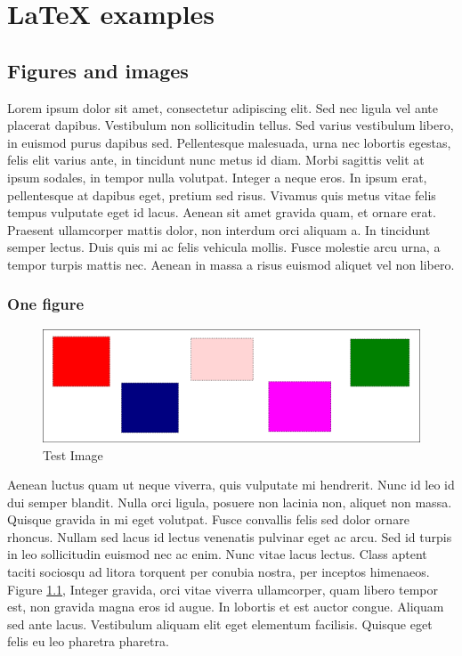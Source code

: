 \chapter{LaTeX examples}

\section{Figures and images}
Lorem ipsum dolor sit amet, consectetur adipiscing elit. Sed nec ligula vel
ante placerat dapibus. Vestibulum non sollicitudin tellus. Sed varius
vestibulum libero, in euismod purus dapibus sed. Pellentesque malesuada, urna
nec lobortis egestas, felis elit varius ante, in tincidunt nunc metus id diam.
Morbi sagittis velit at ipsum sodales, in tempor nulla volutpat. Integer a
neque eros. In ipsum erat, pellentesque at dapibus eget, pretium sed risus.
Vivamus quis metus vitae felis tempus vulputate eget id lacus. Aenean sit amet
gravida quam, et ornare erat. Praesent ullamcorper mattis dolor, non interdum
orci aliquam a. In tincidunt semper lectus. Duis quis mi ac felis vehicula
mollis. Fusce molestie arcu urna, a tempor turpis mattis nec. Aenean in massa a
risus euismod aliquet vel non libero.

\subsection{One figure}

\begin{figure}[h]
    \centering
    \includegraphics[width=\textwidth]{figures/test_image}
    \caption{Test Image}
    \label{fig:test_image}
\end{figure}

Aenean luctus quam ut neque viverra, quis vulputate mi hendrerit. Nunc id leo
id dui semper blandit. Nulla orci ligula, posuere non lacinia non, aliquet non
massa. Quisque gravida in mi eget volutpat. Fusce convallis felis sed dolor
ornare rhoncus. Nullam sed lacus id lectus venenatis pulvinar eget ac arcu. Sed
id turpis in leo sollicitudin euismod nec ac enim. Nunc vitae lacus lectus.
Class aptent taciti sociosqu ad litora torquent per conubia nostra, per
inceptos himenaeos. Figure \ref{fig:test_image}, Integer gravida, orci vitae
viverra ullamcorper, quam libero tempor est, non gravida magna eros id augue.
In lobortis et est auctor congue. Aliquam sed ante lacus. Vestibulum aliquam
elit eget elementum facilisis. Quisque eget felis eu leo pharetra pharetra.

